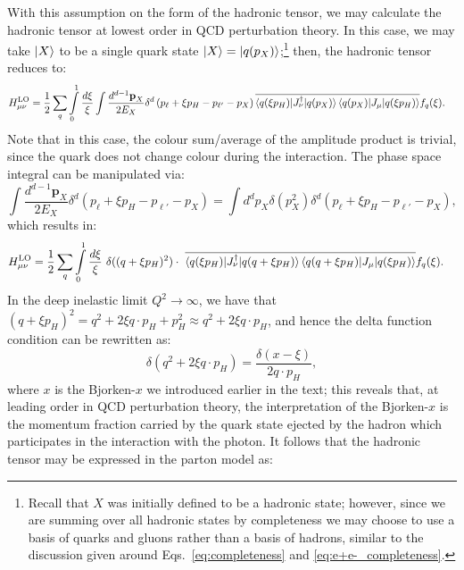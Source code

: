\documentclass[withindex,glossary]{cam-thesis}
\renewcommand{\vec}[1]{\textbf{#1}} %
\begin{document}
With this assumption on the form of the hadronic tensor, we may calculate the hadronic tensor at lowest order in QCD perturbation theory. In this case, we may take $\ket{X}$ to be a single quark state $\ket{X} = \ket{q(p_X)}$;\footnote{Recall that $X$ was initially defined to be a hadronic state; however, since we are summing over all hadronic states by completeness we may choose to use a basis of quarks and gluons rather than a basis of hadrons, similar to the discussion given around Eqs.~\eqref{eq:completeness} and \eqref{eq:e+e-_completeness}.} then, the hadronic tensor reduces to:
\begin{align}
H_{\mu\nu}^{\text{LO}} &= \frac{1}{2} \sum_{q} \int\limits_{0}^{1} \frac{d\xi}{\xi} \int\frac{d^{d-1} \vec{p}_X}{ 2E_{X}} \delta^d\left(p_\ell + \xi p_H - p_{\ell'} - p_X\right)  \overline{\braket{q(\xi p_H) | J_{\nu}^{\dagger} | q(p_X)}\braket{q(p_X) | J_{\mu} | q(\xi p_H) }} f_q(\xi).
\end{align}
Note that in this case, the colour sum/average of the amplitude product is trivial, since the quark does not change colour during the interaction. The phase space integral can be manipulated via:
\begin{equation}
\int\frac{d^{d-1} \vec{p}_X}{ 2E_{X}} \delta^d\left(p_\ell + \xi p_H - p_{\ell'} - p_X\right) = \int d^d p_X \delta(p_X^2) \delta^d\left( p_{\ell} + \xi p_H - p_{\ell'} - p_X \right),
\end{equation}
which results in:
\begin{align}
H_{\mu\nu}^{\text{LO}} &= \frac{1}{2} \sum_{q}\int\limits_{0}^{1} \frac{d\xi}{\xi}\ \delta((q + \xi p_H)^2) \cdot \ \overline{\braket{q(\xi p_H) | J_{\nu}^{\dagger} | q(q + \xi p_H)}\braket{q(q + \xi p_H) | J_{\mu} | q(\xi p_H) }} f_q(\xi).
\end{align}
In the deep inelastic limit $Q^2 \rightarrow \infty$, we have that $(q + \xi p_H)^2 = q^2 + 2 \xi q \cdot p_H + p_H^2 \approx q^2 + 2 \xi q \cdot p_H$, and hence the delta function condition can be rewritten as:
\begin{equation}
\delta(q^2 + 2 \xi q \cdot p_H) = \frac{\delta(x - \xi)}{2 q \cdot p_H},
\end{equation}
where $x$ is the Bjorken-$x$ we introduced earlier in the text; this reveals that, at leading order in QCD perturbation theory, the interpretation of the Bjorken-$x$ is the momentum fraction carried by the quark state ejected by the hadron which participates in the interaction with the photon. It follows that the hadronic tensor may be expressed in the parton model as:
\end{document}
